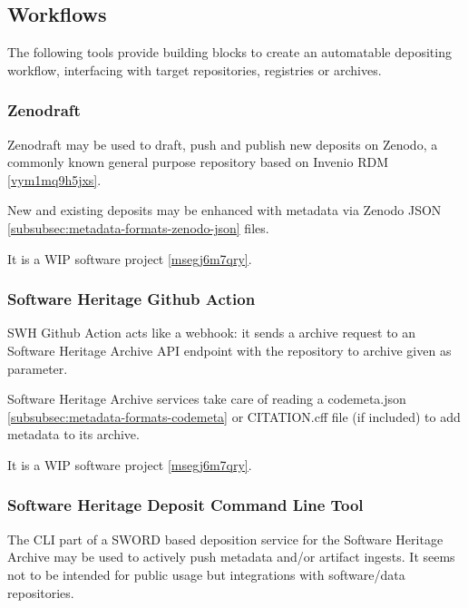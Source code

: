 \documentclass{article}
\begin{document}
\subsection{Workflows}\label{w6t3wd4fqysc}
The following tools provide building blocks to create an automatable depositing workflow, interfacing with target repositories, registries or archives.



\subsubsection{Zenodraft}\label{o71h0jljbmme}
Zenodraft \cite{11045035/VXRILTTG} may be used to draft, push and publish new deposits on Zenodo, a commonly known general purpose repository based on Invenio RDM \ref{vym1mq9h5jxs}.

New and existing deposits may be enhanced with metadata via Zenodo JSON \ref{subsubsec:metadata-formats-zenodo-json} files.

It is a WIP software project \ref{msegj6m7qry}.



\subsubsection{Software Heritage Github Action}\label{tzwlyl3ildzb}
SWH Github Action \cite{11045035/U5SGIYLE} acts like a webhook: it sends a archive request to an Software Heritage Archive API endpoint with the repository to archive given as parameter.

Software Heritage Archive services take care of reading a codemeta.json \ref{subsubsec:metadata-formats-codemeta} or CITATION.cff \cite{138880/M4MT8YLA} file (if included) to add metadata to its archive.

It is a WIP software project \ref{msegj6m7qry}.



\subsubsection{Software Heritage Deposit Command Line Tool}\label{k8b3f8dzavl}
The CLI part of a SWORD \cite{138880/5XMKCCSZ} based deposition service for the Software Heritage Archive may be used to actively push metadata and/or artifact ingests. It seems not to be intended for public usage but integrations with software/data repositories.
\end{document}
